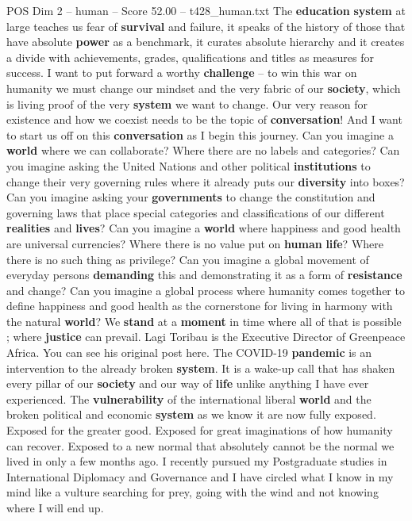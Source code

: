 \begin{textsample}{POS Dim 2 – human – Score 52.00 – t428\_human.txt}
The \textbf{education} \textbf{system} at large teaches us fear of \textbf{survival} and failure, it speaks of the history of those that have absolute \textbf{power} as a benchmark, it curates absolute hierarchy and it creates a divide with achievements, grades, qualifications and titles as measures for success.
I want to put forward a worthy \textbf{challenge} – to win this war on humanity we must change our mindset and the very fabric of our \textbf{society}, which is living proof of the very \textbf{system} we want to change.
Our very reason for existence and how we coexist needs to be the topic of \textbf{conversation}!
And I want to start us off on this \textbf{conversation} as I begin this journey.
Can you imagine a \textbf{world} where we can collaborate?
Where there are no labels and categories?
Can you imagine asking the United Nations and other political \textbf{institutions} to change their very governing rules where it already puts our \textbf{diversity} into boxes?
Can you imagine asking your \textbf{governments} to change the constitution and governing laws that place special categories and classifications of our different \textbf{realities} and \textbf{lives}?
Can you imagine a \textbf{world} where happiness and good health are universal currencies?
Where there is no value put on \textbf{human} \textbf{life}?
Where there is no such thing as privilege?
Can you imagine a global movement of everyday persons \textbf{demanding} this and demonstrating it as a form of \textbf{resistance} and change?
Can you imagine a global process where humanity comes together to define happiness and good health as the cornerstone for living in harmony with the natural \textbf{world}?
We \textbf{stand} at a \textbf{moment} in time where all of that is possible ; where \textbf{justice} can prevail.
Lagi Toribau is the Executive Director of Greenpeace Africa.
You can see his original post here.
The COVID-19 \textbf{pandemic} is an intervention to the already broken \textbf{system}.
It is a wake-up call that has shaken every pillar of our \textbf{society} and our way of \textbf{life} unlike anything I have ever experienced.
The \textbf{vulnerability} of the international liberal \textbf{world} and the broken political and economic \textbf{system} as we know it are now fully exposed.
Exposed for the greater good.
Exposed for great imaginations of how humanity can recover.
Exposed to a new normal that absolutely cannot be the normal we lived in only a few months ago.
I recently pursued my Postgraduate studies in International Diplomacy and Governance and I have circled what I know in my mind like a vulture searching for prey, going with the wind and not knowing where I will end up.

\end{textsample}
